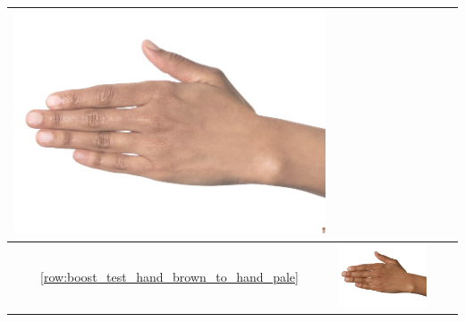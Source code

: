 \documentclass[12pt, a4paper]{article}
\begin{document}
\begin{longtable}{|c||c|c|c|}
\begin{minipage}{.29\textwidth}
    \includegraphics[width=\textwidth,height=\textheight,keepaspectratio]{../rc_test/outputs/20170516_boost_test/hand_brown_to_hand_light.jpg}
  \end{minipage} \\
  \hline  \ref{row:boost_test_hand_brown_to_hand_pale} &
  \begin{minipage}{.29\textwidth}
    \includegraphics[width=\textwidth,height=\textheight,keepaspectratio]{../inputs/hand_brown.jpg}
  \end{minipage} & 
  \begin{minipage}{.29\textwidth}

\end{minipage}
\end{longtable}
\end{document}
